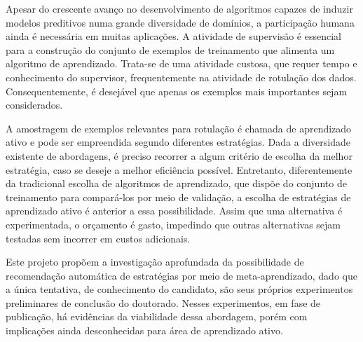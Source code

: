 Apesar do crescente avanço no desenvolvimento de algoritmos capazes de induzir modelos preditivos
numa grande diversidade de domínios, a participação humana ainda é necessária em
muitas aplicações.
A atividade de supervisão é essencial para a construção do conjunto de exemplos
de treinamento que alimenta um algoritmo de aprendizado.
Trata-se de uma atividade custosa, que requer tempo e conhecimento do supervisor, frequentemente na atividade de rotulação dos dados.
Consequentemente, é desejável que apenas os exemplos mais importantes sejam
considerados.

A amostragem de exemplos relevantes para rotulação é chamada
de aprendizado ativo e pode ser empreendida segundo diferentes estratégias.
Dada a diversidade existente de abordagens,
é preciso recorrer a algum critério de escolha da melhor estratégia,
caso se deseje a melhor eficiência possível.
Entretanto, diferentemente da tradicional escolha de algoritmos de aprendizado, que dispõe do conjunto de treinamento para compará-los por meio de validação,
a escolha de estratégias de aprendizado ativo é anterior a essa possibilidade.
Assim que uma alternativa é experimentada, o orçamento é gasto,
impedindo que outras alternativas sejam testadas sem incorrer em custos
adicionais.

Este projeto propõem a investigação aprofundada da possibilidade de recomendação
automática de estratégias por meio de meta-aprendizado,
dado que a única tentativa, de conhecimento do candidato, são seus
próprios experimentos preliminares de conclusão do doutorado.
Nesses experimentos, em fase de publicação,
há evidências da viabilidade dessa abordagem, porém
com implicações ainda desconhecidas para área de aprendizado ativo.